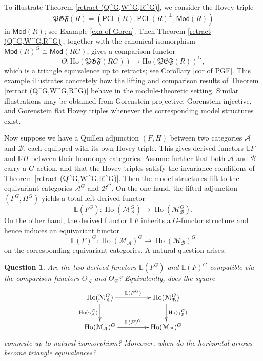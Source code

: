 \documentclass[12pt,twoside]{amsart}
\newtheorem{intque}{Question}[]
\theoremstyle{bfupright head,slanted body}
\theoremstyle{bfupright head,upright body}
\theoremstyle{fixed bf head,slanted body}
\theoremstyle{fixed bf head,upright body}
\theoremstyle{numbered paragraph}
\numberwithin{equation}{res}
\newcommand{\PGF}{\mathsf{PGF}}
\newcommand{\Mod}{\mathsf{Mod}}
\newcommand{\Ho}{\mathrm{Ho}}
\begin{document}
To illustrate Theorem \ref{retract (Q^G,W^G,R^G)}, we consider the Hovey triple
\[
\mathfrak{PGF}(R)=(\PGF(R),\PGF(R)^\bot,\Mod(R))
\]
in $\Mod(R)$; see Example \ref{exa of Goren}.
Then Theorem \ref{retract (Q^G,W^G,R^G)}, together with the canonical isomorphism $\Mod(R)^G \cong \Mod(RG)$, gives a comparison functor
\[
\Theta : \Ho(\mathfrak{PGF}(RG)) \to \Ho(\mathfrak{PGF}(R))^G,
\]
which is a triangle equivalence up to retracts; see Corollary \ref{cor of PGF}.
This example illustrates concretely how the lifting and comparison results of Theorem \ref{retract (Q^G,W^G,R^G)} behave in the module-theoretic setting. Similar illustrations may be obtained from Gorenstein projective, Gorenstein injective, and Gorenstein flat Hovey triples whenever the corresponding model structures exist.

Now suppose we have a Quillen adjunction \((F, H)\) between two categories \(\mathcal A\) and \(\mathcal B\), each equipped with its own Hovey triple.
This gives derived functors \(\mathbb{L}F\) and \(\mathbb{R}H\) between their homotopy categories.
Assume further that both \(\mathcal A\) and \(\mathcal B\) carry a \(G\)-action, and that the Hovey triples satisfy the invariance conditions of Theorem \ref{retract (Q^G,W^G,R^G)}.
Then the model structures lift to the equivariant categories \(\mathcal A^G\) and \(\mathcal B^G\).
On the one hand, the lifted adjunction \((F^G, H^G)\) yields a total left derived functor
\[
\mathbb{L}(F^G) : \operatorname{Ho}(\mathcal M_{\mathcal A}^G) \longrightarrow \operatorname{Ho}(\mathcal M_{\mathcal B}^G).
\]
On the other hand, the derived functor $\mathbb{L}F$ inherits a $G$-functor structure and hence induces an equivariant functor
\[
\mathbb{L}(F)^G : \operatorname{Ho}(\mathcal M_{\mathcal A})^G \longrightarrow \operatorname{Ho}(\mathcal M_{\mathcal B})^G
\]
on the corresponding equivariant categories.
A natural question arises:

\begin{intque}\label{queb}
Are the two derived functors \(\mathbb{L}(F^G)\) and \(\mathbb{L}(F)^G\) compatible via the comparison functors \(\Theta_{\mathcal A}\) and \(\Theta_{\mathcal B}\)?
Equivalently, does the square
\[
\xymatrix@C=1.5CM{
   \operatorname{Ho}(\mathcal M_{\mathcal A}^G)  \ar[d]_-{\operatorname{Ho}(\gamma_{\mathcal A}^G)}  \ar[r]^-{\mathbb{L}(F^G)}
&  \operatorname{Ho}(\mathcal M_{\mathcal B}^G)  \ar[d]^-{\operatorname{Ho}(\gamma_{\mathcal B}^G)}             \\
   \operatorname{Ho}(\mathcal M_{\mathcal A})^G                                 \ar[r]^-{\mathbb{L}(F)^G}
&  \operatorname{Ho}(\mathcal M_{\mathcal B})^G                                            }
\]
commute up to natural isomorphism?
Moreover, when do the horizontal arrows become triangle equivalences?
\end{intque}
\end{document}
